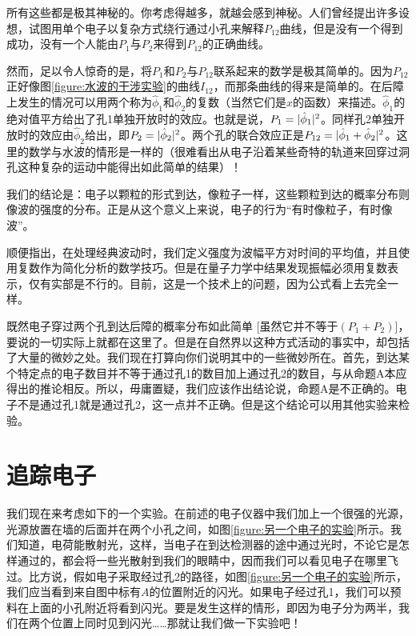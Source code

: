 所有这些都是极其神秘的。你考虑得越多，就越会感到神秘。人们曾经提出许多设想，试图用单个电子以复杂方式绕行通过小孔来解释$P_{12}$曲线，但是没有一个得到成功，没有一个人能由$P_1$与$P_2$来得到$P_{12}$的正确曲线。

然而，足以令人惊奇的是，将$P_1$和$P_2$与$P_{12}$联系起来的数学是极其简单的。因为$P_{12}$正好像图\ref{figure:水波的干涉实验}的曲线$I_{12}$，而那条曲线的得来是简单的。在后障上发生的情况可以用两个称为$\hat{\phi}_1$和$\hat{\phi}_2$的复数（当然它们是$x$的函数）来描述。$\hat{\phi}_1$的绝对值平方给出了孔1单独开放时的效应。也就是说，$P_1 = \lvert\hat{\phi}_1\rvert^2$。同样孔2单独开放时的效应由$\hat{\phi}_2$给出，即$P_2 = \lvert\hat{\phi}_2\rvert^2$。两个孔的联合效应正是$P_{12} = \lvert\hat{\phi}_1 + \hat{\phi}_2\rvert^2$。这里的数学与水波的情形是一样的（很难看出从电子沿着某些奇特的轨道来回穿过洞孔这种复杂的运动中能得出如此简单的结果）！

我们的结论是：电子以颗粒的形式到达，像粒子一样，这些颗粒到达的概率分布则像波的强度的分布。正是从这个意义上来说，电子的行为“有时像粒子，有时像波”。

顺便指出，在处理经典波动时，我们定义强度为波幅平方对时间的平均值，并且使用复数作为简化分析的数学技巧。但是在量子力学中结果发现振幅必须用复数表示，仅有实部是不行的。目前，这是一个技术上的问题，因为公式看上去完全一样。

既然电子穿过两个孔到达后障的概率分布如此简单 [虽然它并不等于$(P_1+P_2)$]，要说的一切实际上就都在这里了。但是在自然界以这种方式活动的事实中，却包括了大量的微妙之处。我们现在打算向你们说明其中的一些微妙所在。首先，到达某个特定点的电子数目并不等于通过孔1的数目加上通过孔2的数目，与从命题A本应得出的推论相反。所以，毋庸置疑，我们应该作出结论说，命题A是不正确的。电子不是通过孔1就是通过孔2，这一点并不正确。但是这个结论可以用其他实验来检验。

\section{追踪电子}

我们现在来考虑如下的一个实验。在前述的电子仪器中我们加上一个很强的光源，光源放置在墙的后面并在两个小孔之间，如图\ref{figure:另一个电子的实验}所示。我们知道，电荷能散射光，这样，当电子在到达检测器的途中通过光时，不论它是怎样通过的，都会将一些光散射到我们的眼睛中，因而我们可以看见电子在哪里飞过。比方说，假如电子采取经过孔2的路径，如图\ref{figure:另一个电子的实验}所示，我们应当看到来自图中标有$A$的位置附近的闪光。如果电子经过孔1，我们可以预料在上面的小孔附近将看到闪光。要是发生这样的情形，即因为电子分为两半，我们在两个位置上同时见到闪光……那就让我们做一下实验吧！

